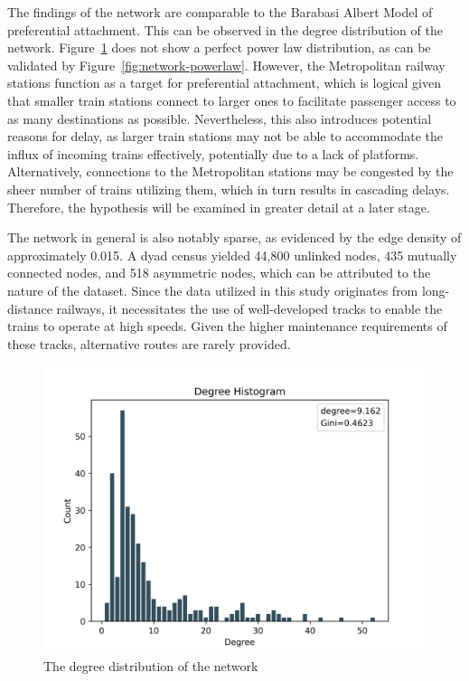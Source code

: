 \documentclass[12pt,a4paper]{article}
\newcounter{para}
\begin{document}
The findings of the network are comparable to the Barabasi Albert Model of preferential attachment. This can be observed in the degree distribution of the network. 
Figure~\ref{fig:network-deg-dist} does not show a perfect power law distribution, as can be validated by Figure~\ref{fig:network-powerlaw}. 
However, the Metropolitan railway stations function as a target for preferential attachment, which is logical given that smaller train stations connect to larger ones to facilitate passenger access to as many destinations as possible. 
Nevertheless, this also introduces potential reasons for delay, as larger train stations may not be able to accommodate the influx of incoming trains effectively, potentially due to a lack of platforms. Alternatively, connections to the Metropolitan stations may be congested by the sheer number of trains utilizing them, which in turn results in cascading delays. 
Therefore, the hypothesis will be examined in greater detail at a later stage. 

The network in general is also notably sparse, as evidenced by the edge density of approximately 0.015. 
A dyad census yielded 44,800 unlinked nodes, 435 mutually connected nodes, and 518 asymmetric nodes, which can be attributed to the nature of the dataset. Since the data utilized in this study originates from long-distance railways, it necessitates the use of well-developed tracks to enable the trains to operate at high speeds. Given the higher maintenance requirements of these tracks, alternative routes are rarely provided.

\begin{figure}[!h]
  \includegraphics[clip=true,width=\columnwidth]{../data/visualizations/degree_dist.png}
  \caption{The degree distribution of the network}
   \label{fig:network-deg-dist}
\end{figure}
\end{document}
